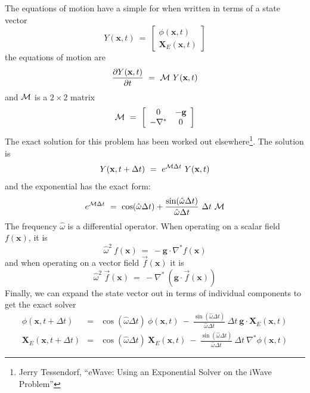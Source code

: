 \documentclass{article}
\def\xvec{\textbf{x}}
\def\gvec{\textbf{g}}
\def\Xvec{\textbf{X}}
\def\mmm{{\cal M}}
\def\what{{\hat{\omega}}}
\def\dt{\Delta t}
\def\inabla{\nabla^{*}}
\begin{document}
The equations of motion have a simple for when written in terms of a state vector 
\begin{equation}
Y(\xvec,t) \ =\ \left[ \begin{array}{c} \phi(\xvec,t) \\ \Xvec_E(\xvec,t)  \end{array} \right]
\end{equation} 
the equations of motion are
\begin{equation}
\frac{\partial Y(\xvec,t)}{\partial t} \ =\ \mmm  \   Y(\xvec,t)
\end{equation}
and $\mmm$ is a $2\times 2$ matrix
\begin{equation}
\mmm \ =\  \left[ \begin{array}{cc} 0 & -\gvec \\ -\inabla & 0  \end{array} \right]
\end{equation}
The exact solution for this problem has been worked out elsewhere\footnote{Jerry Tessendorf, ``eWave: Using an Exponential Solver on the iWave Problem''}.  The solution is
\begin{equation}
Y(\xvec,t+\dt) \ =\ e^{\mmm \dt}\ Y(\xvec,t)
\end{equation}
and the exponential has the exact form:
\begin{equation}
e^{\mmm\dt} \ =\  \cos(\what\dt) + \frac{\sin(\what\dt)}{\what\dt}\ \dt\ \mmm 
\end{equation}
The frequency $\what$ is a differential operator. When operating on a scalar field $f(\xvec)$, it is
\begin{equation}
\what^2 \ f(\xvec) \ =\ -\gvec\cdot\inabla f(\xvec)
\end{equation}
and when operating on a vector field $\vec{f}(\xvec)$ it is
\begin{equation}
\what^2 \ \vec{f}(\xvec) \ =\ -\inabla\ \left(\gvec\cdot\vec{f}(\xvec)\right)
\end{equation}
Finally, we can expand the state vector out in terms of individual components to get the exact solver 
\begin{eqnarray}
\phi(\xvec,t+\dt) &=& \cos(\what\dt)\ \phi(\xvec,t) \ -\  \frac{\sin(\what\dt)}{\what\dt}\ \dt\ \gvec\cdot\Xvec_E(\xvec,t) \\
\Xvec_E(\xvec,t+\dt) &=& \cos(\what\dt)\ \Xvec_E(\xvec,t) \ -\  \frac{\sin(\what\dt)}{\what\dt}\ \dt\ \inabla\phi(\xvec,t)
\end{eqnarray}
\end{document}
